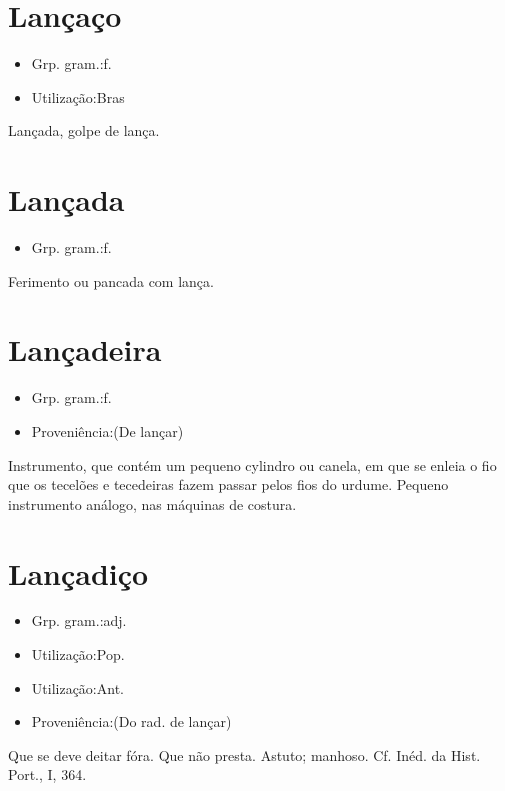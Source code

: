 \section{Lançaço}
\begin{itemize}
\item {Grp. gram.:f.}
\end{itemize}
\begin{itemize}
\item {Utilização:Bras}
\end{itemize}
Lançada, golpe de lança.
\section{Lançada}
\begin{itemize}
\item {Grp. gram.:f.}
\end{itemize}
Ferimento ou pancada com lança.
\section{Lançadeira}
\begin{itemize}
\item {Grp. gram.:f.}
\end{itemize}
\begin{itemize}
\item {Proveniência:(De \textunderscore lançar\textunderscore )}
\end{itemize}
Instrumento, que contém um pequeno cylindro ou canela, em que se enleia o fio que os tecelões e tecedeiras fazem passar pelos fios do urdume.
Pequeno instrumento análogo, nas máquinas de costura.
\section{Lançadiço}
\begin{itemize}
\item {Grp. gram.:adj.}
\end{itemize}
\begin{itemize}
\item {Utilização:Pop.}
\end{itemize}
\begin{itemize}
\item {Utilização:Ant.}
\end{itemize}
\begin{itemize}
\item {Proveniência:(Do rad. de \textunderscore lançar\textunderscore )}
\end{itemize}
Que se deve deitar fóra.
Que não presta.
Astuto; manhoso. Cf. \textunderscore Inéd. da Hist. Port.\textunderscore , I, 364.
